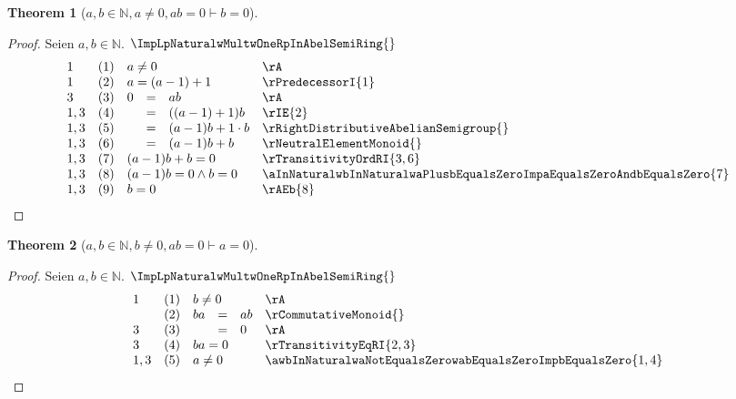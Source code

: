 \documentclass{book}
\theoremstyle{plain}
\newtheorem{theorem}{Theorem}
\theoremstyle{remark}
\theoremstyle{definition}
\begin{document}
\label{awbInNaturalwaNotEqualsZerowabEqualsZeroImpbEqualsZero}
\begin{theorem}[\(a,b\in\mathbb{N},a\neq 0,ab=0\vdash b=0\)]
\end{theorem}
\begin{proof}
        Seien \(a,b\in\mathbb{N}\). \(\ImpLpNaturalwMultwOneRpInAbelSemiRing{}\)
        \[
	\begin{array}{llclll}
            1       &  (1)  & \multicolumn{3}{l}{a\neq 0} & \rA \\
            1       &  (2)  & \multicolumn{3}{l}{a=(a-1)+1} & \rPredecessorI{1} \\
            3       &  (3)  & 0&=&ab & \rA \\
            1,3     &  (4)  &  &=&((a-1)+1)b & \rIE{2} \\
            1,3     &  (5)  &  &=&(a-1)b+1\cdot b & \rRightDistributiveAbelianSemigroup{} \\
            1,3     &  (6)  &  &=&(a-1)b+b & \rNeutralElementMonoid{} \\
            1,3     &  (7)  & \multicolumn{3}{l}{(a-1)b+b=0} & \rTransitivityOrdRI{3,6} \\
            1,3     &  (8)  & \multicolumn{3}{l}{(a-1)b=0\land b=0} & \aInNaturalwbInNaturalwaPlusbEqualsZeroImpaEqualsZeroAndbEqualsZero{7}\\  
            1,3     &  (9)  & \multicolumn{3}{l}{b=0} & \rAEb{8}\\  
	\end{array}
	\]
\end{proof}

\label{awbInNaturalwbNotEqualsZerowabEqualsZeroImpaEqualsZero}
\begin{theorem}[\(a,b\in\mathbb{N},b\neq 0,ab=0\vdash a=0\)]
\end{theorem}
\begin{proof}
        Seien \(a,b\in\mathbb{N}\). \(\ImpLpNaturalwMultwOneRpInAbelSemiRing{}\)
        \[
	\begin{array}{llclll}
            1       &  (1)  & \multicolumn{3}{l}{b\neq 0} & \rA \\
                    &  (2)  & ba&=&ab & \rCommutativeMonoid{} \\
            3       &  (3)  &   &=&0 & \rA \\
            3       &  (4)  & \multicolumn{3}{l}{ba=0} & \rTransitivityEqRI{2,3} \\
            1,3     &  (5)  & \multicolumn{3}{l}{a\neq 0} & \awbInNaturalwaNotEqualsZerowabEqualsZeroImpbEqualsZero{1,4} \\            
	\end{array}
	\]
\end{proof}
\end{document}
